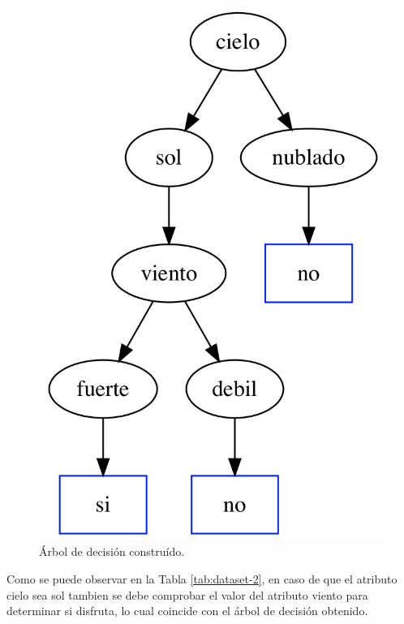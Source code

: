 \documentclass[a4paper]{article}
\begin{document}
\begin{figure}[h]
  \centering
    \includegraphics[scale=0.46]{img/tree2.png}
  \caption{Árbol de decisión construído.}
  \label{ej1-tree2}
\end{figure}

Como se puede observar en la Tabla \ref{tab:dataset-2}, en caso de que el atributo cielo sea sol tambien se debe comprobar el valor del atributo viento para determinar si disfruta, lo cual coincide con el árbol de decisión obtenido.
\end{document}
